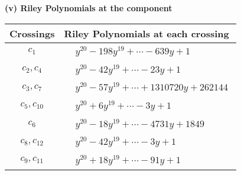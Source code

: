 \documentclass[1p]{elsarticle_modified}
\theoremstyle{definition}
\begin{document}
\newpage\renewcommand{\arraystretch}{1}
\flushleft \textbf{(v) Riley Polynomials at the component}\newline \\
\begin{tabular}{m{50pt}|m{274pt}}
Crossings & \hspace{64pt}Riley Polynomials at each crossing \\
\hline $$\begin{aligned}c_{1}\end{aligned}$$&$\begin{aligned}
&y^{20}-198 y^{19}+\cdots-639 y+1
\end{aligned}$\\
\hline $$\begin{aligned}c_{2},c_{4}\end{aligned}$$&$\begin{aligned}
&y^{20}-42 y^{19}+\cdots-23 y+1
\end{aligned}$\\
\hline $$\begin{aligned}c_{3},c_{7}\end{aligned}$$&$\begin{aligned}
&y^{20}-57 y^{19}+\cdots+1310720 y+262144
\end{aligned}$\\
\hline $$\begin{aligned}c_{5},c_{10}\end{aligned}$$&$\begin{aligned}
&y^{20}+6 y^{19}+\cdots-3 y+1
\end{aligned}$\\
\hline $$\begin{aligned}c_{6}\end{aligned}$$&$\begin{aligned}
&y^{20}-18 y^{19}+\cdots-4731 y+1849
\end{aligned}$\\
\hline $$\begin{aligned}c_{8},c_{12}\end{aligned}$$&$\begin{aligned}
&y^{20}-42 y^{19}+\cdots-3 y+1
\end{aligned}$\\
\hline $$\begin{aligned}c_{9},c_{11}\end{aligned}$$&$\begin{aligned}
&y^{20}+18 y^{19}+\cdots-91 y+1
\end{aligned}$\\
\hline
\end{tabular}\\~\\
\end{document}
